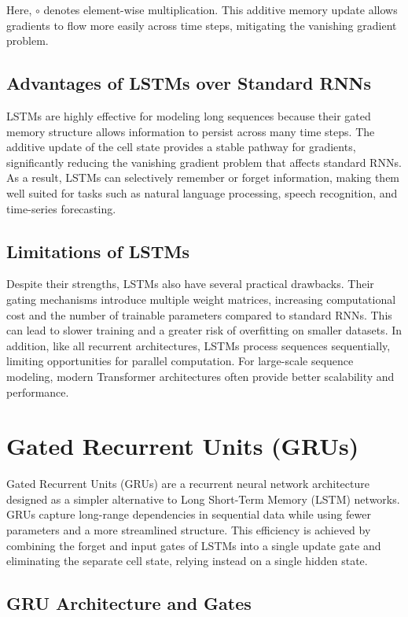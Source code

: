 \documentclass{article}
\begin{document}
Here, \( \circ \) denotes element-wise multiplication.  
This additive memory update allows gradients to flow more easily across time steps, mitigating the vanishing gradient problem.

\subsection{Advantages of LSTMs over Standard RNNs}

LSTMs are highly effective for modeling long sequences because their gated memory structure allows information to persist across many time steps. The additive update of the cell state provides a stable pathway for gradients, significantly reducing the vanishing gradient problem that affects standard RNNs. As a result, LSTMs can selectively remember or forget information, making them well suited for tasks such as natural language processing, speech recognition, and time-series forecasting.

\subsection{Limitations of LSTMs}

Despite their strengths, LSTMs also have several practical drawbacks. Their gating mechanisms introduce multiple weight matrices, increasing computational cost and the number of trainable parameters compared to standard RNNs. This can lead to slower training and a greater risk of overfitting on smaller datasets. In addition, like all recurrent architectures, LSTMs process sequences sequentially, limiting opportunities for parallel computation. For large-scale sequence modeling, modern Transformer architectures often provide better scalability and performance.

\section{Gated Recurrent Units (GRUs)}

Gated Recurrent Units (GRUs) are a recurrent neural network architecture designed as a simpler alternative to Long Short-Term Memory (LSTM) networks. GRUs capture long-range dependencies in sequential data while using fewer parameters and a more streamlined structure. This efficiency is achieved by combining the forget and input gates of LSTMs into a single update gate and eliminating the separate cell state, relying instead on a single hidden state.

\subsection{GRU Architecture and Gates}
\end{document}
